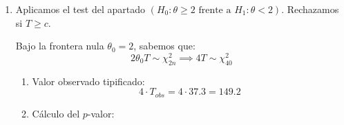\begin{enumerate}[label=\color{red}\textbf{\arabic*)}]
\begin{enumerate}[label=\color{red}\textbf{\alph*)}]
		            Reescribiendo la verosimilitud como $L(\theta)\propto \exp \{A(\theta)T(\mathbf{x})\}$, tenemos que $A(\theta)=-(\theta+1)$.

		            La derivada $A'(\theta)=-1<0$ indica que $A(\theta)$ es estrictamente decreciente. Por tanto, la familia posee Cociente de Verosimilitud Monótono (CVM) inverso respecto al estadístico $T(\mathbf{x})$, o directo respecto a $-T(\mathbf{x})$.

		            Para la alternativa $H_1:\theta<\theta_0$, el teorema de CVM estipula que la región de rechazo se opone al comportamiento de la función $A(\theta)$. Puesto que al derivada es negativa, el test rechaza para valores \textbf{grandes} del estadístico: \[
			            S_1=\left\{ \mathbf{x}\bigg| \sum_{i=1}^{n} \ln(1+x_{i})\ge c \right\}
		            \]
		            Con extensión impuesta en la frontera: $P_{\theta_0}\left( \sum_{i=1}^{n} \ln(1+X_i)\ge c \right)=\alpha$.
		      \item {}

		            Aplicamos el test del apartado  $(H_0:\theta\ge 2\text{ frente a }H_1:\theta<2)$. Rechazamos si $T\ge c$.

		            Bajo la frontera nula $\theta_0=2$, sabemos que: \[
			            2\theta_0T\sim \chi_{2n}^2\implies 4T\sim \chi_{40}^2
		            \]
		            \begin{enumerate}[label=\arabic*)]
			            \item Valor observado tipificado: \[
				                  4\cdot T_{obs}=4\cdot 37.3=149.2
			                  \]
			            \item Cálculo del $p$-valor:


\end{enumerate}
\end{enumerate}
\end{enumerate}
